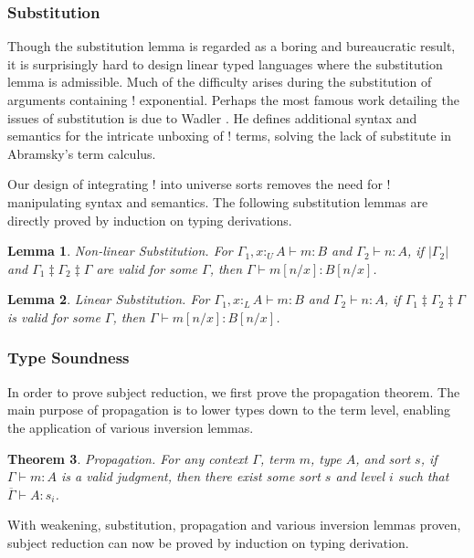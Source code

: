 \documentclass[sigplan,screen,review,authordraft]{acmart}
\newtheorem{theorem}{Theorem}[section]
\newtheorem{lemma}[theorem]{Lemma}
\theoremstyle{definition}
\newcommand{\pure}[1]{|#1|}
\newcommand{\utype}{:_{\scriptscriptstyle U}}
\newcommand{\ltype}{:_{\scriptscriptstyle L}}
\newcommand{\mrg}[3]{#1\ddagger#2\ddagger#3}
\begin{document}
  \subsubsection{Substitution} \label{subst}
  Though the substitution lemma is regarded as a boring and bureaucratic result, it is surprisingly hard to design linear typed languages where the substitution lemma is admissible. Much of the difficulty arises during the substitution of arguments containing ! exponential. Perhaps the most famous work detailing the issues of substitution is due to Wadler \cite{substitute}. He defines additional syntax and semantics for the intricate unboxing of ! terms, solving the lack of substitute in Abramsky's term calculus.

  Our design of integrating ! into universe sorts removes the need for ! manipulating syntax and semantics. The following substitution lemmas are directly proved by induction on typing derivations.

  \begin{lemma} 
    Non-linear Substitution. For $\Gamma_1, x \utype A \vdash m : B$ and $\Gamma_2 \vdash n : A$, if $\pure{\Gamma_2}$ and $\mrg{\Gamma_1}{\Gamma_2}{\Gamma}$ are valid for some $\Gamma$, then $\Gamma \vdash m[n/x] : B[n/x]$.
  \end{lemma}

  \begin{lemma} 
    Linear Substitution. For $\Gamma_1, x \ltype A \vdash m : B$ and $\Gamma_2 \vdash n : A$, if $\mrg{\Gamma_1}{\Gamma_2}{\Gamma}$ is valid for some $\Gamma$, then $\Gamma \vdash m[n/x] : B[n/x]$.
  \end{lemma}

  \subsubsection{Type Soundness}
  In order to prove subject reduction, we first prove the propagation theorem. The main purpose of propagation is to lower types down to the term level, enabling the application of various inversion lemmas.

  \begin{theorem} 
    Propagation. For any context $\Gamma$, term $m$, type $A$, and sort $s$, if $\Gamma \vdash m : A$ is a valid judgment, then there exist some sort $s$ and level $i$ such that $\overline{\Gamma} \vdash A : s_i$.
    \label{propagation}
  \end{theorem}

  With weakening, substitution, propagation and various inversion lemmas proven, subject reduction can now be proved by induction on typing derivation.
\end{document}
